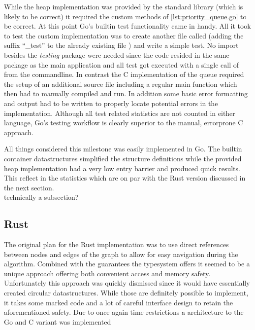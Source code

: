 While the heap implementation was provided by the standard library (which is likely to be correct) it required the custom methods of \autoref{lst:priority_queue.go} to be correct. At this point Go's builtin test functionality came in handy. All it took to test the custom implementation was to create another file called  (adding the suffix ``\_test'' to the already existing file ) and write a simple test. No import besides the \textit{testing} package were needed since the code resided in the same package as the main application and all test got executed with a single call of  from the commandline. In contrast the C implementation of the queue required the setup of an additional source file including a regular main function which then had to manually compiled and run. In addition some basic error formatting and output had to be written to properly locate potential errors in the implementation. Although all test related statistics are not counted in either language, Go's testing workflow is clearly superior to the manual, errorprone C approach.

All things considered this milestone was easily implemented in Go. The builtin container datastructures simplified the structure definitions while the provided heap implementation had a very low entry barrier and produced quick results. This reflect in the statistics which are on par with the Rust version discussed in the next section. \\technically a subsection?

\subsection{Rust}
\label{subsec:Implementation::Graph_Representation::Rust}

The original plan for the Rust implementation was to use direct references between nodes and edges of the graph to allow for easy navigation during the algorithm. Combined with the guarantees the typesystem offers it seemed to be a unique approach offering both convenient access and memory safety. Unfortunately this approach was quickly dismissed since it would have essentially created circular datastructures. While those are definitely possible to implement, it takes some  marked code and a lot of careful interface design to retain the aforementioned safety. Due to once again time restrictions a architecture to the Go and C variant was implemented

